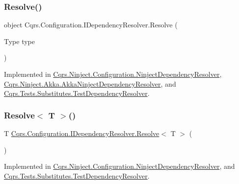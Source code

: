 \subsubsection{\texorpdfstring{Resolve()}{Resolve()}}
{\footnotesize\ttfamily object Cqrs.\+Configuration.\+I\+Dependency\+Resolver.\+Resolve (\begin{DoxyParamCaption}\item[{Type}]{type }\end{DoxyParamCaption})}



Implemented in \hyperlink{classCqrs_1_1Ninject_1_1Configuration_1_1NinjectDependencyResolver_aef2a2be58a2562a349572e9946cd2930_aef2a2be58a2562a349572e9946cd2930}{Cqrs.\+Ninject.\+Configuration.\+Ninject\+Dependency\+Resolver}, \hyperlink{classCqrs_1_1Ninject_1_1Akka_1_1AkkaNinjectDependencyResolver_adace29de71f10e34e952bd41e48106a6_adace29de71f10e34e952bd41e48106a6}{Cqrs.\+Ninject.\+Akka.\+Akka\+Ninject\+Dependency\+Resolver}, and \hyperlink{classCqrs_1_1Tests_1_1Substitutes_1_1TestDependencyResolver_a05767824475ea6affbf6f70cf5b1fd06_a05767824475ea6affbf6f70cf5b1fd06}{Cqrs.\+Tests.\+Substitutes.\+Test\+Dependency\+Resolver}.

\mbox{\label{interfaceCqrs_1_1Configuration_1_1IDependencyResolver_a9dc7694a365209a5ef05270a7cfa7b6b_a9dc7694a365209a5ef05270a7cfa7b6b}} 
\subsubsection{\texorpdfstring{Resolve$<$ T $>$()}{Resolve< T >()}}
{\footnotesize\ttfamily T \hyperlink{interfaceCqrs_1_1Configuration_1_1IDependencyResolver_aa455096b7b94fc1d64904bc67830ec06_aa455096b7b94fc1d64904bc67830ec06}{Cqrs.\+Configuration.\+I\+Dependency\+Resolver.\+Resolve}$<$ T $>$ (\begin{DoxyParamCaption}{ }\end{DoxyParamCaption})}



Implemented in \hyperlink{classCqrs_1_1Ninject_1_1Configuration_1_1NinjectDependencyResolver_a35cbb03e98326a3d10ba86c427148b3c_a35cbb03e98326a3d10ba86c427148b3c}{Cqrs.\+Ninject.\+Configuration.\+Ninject\+Dependency\+Resolver}, and \hyperlink{classCqrs_1_1Tests_1_1Substitutes_1_1TestDependencyResolver_a67090a882241fa6a881d49c91c95cad7_a67090a882241fa6a881d49c91c95cad7}{Cqrs.\+Tests.\+Substitutes.\+Test\+Dependency\+Resolver}.

